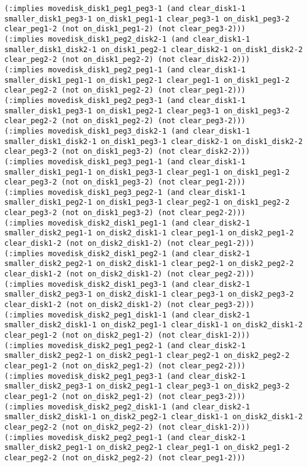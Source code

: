 \documentclass[12pt,letterpaper]{ntdhw}
\begin{document}
\begin{enumerate}
\begin{enumerate}
\begin{lstlisting}[language=pddl, style=pddlstyle,
  basicstyle=\scriptsize]
(:implies movedisk_disk1_peg1_peg3-1 (and clear_disk1-1 smaller_disk1_peg3-1 on_disk1_peg1-1 clear_peg3-1 on_disk1_peg3-2 clear_peg1-2 (not on_disk1_peg1-2) (not clear_peg3-2)))
(:implies movedisk_disk1_peg2_disk2-1 (and clear_disk1-1 smaller_disk1_disk2-1 on_disk1_peg2-1 clear_disk2-1 on_disk1_disk2-2 clear_peg2-2 (not on_disk1_peg2-2) (not clear_disk2-2)))
(:implies movedisk_disk1_peg2_peg1-1 (and clear_disk1-1 smaller_disk1_peg1-1 on_disk1_peg2-1 clear_peg1-1 on_disk1_peg1-2 clear_peg2-2 (not on_disk1_peg2-2) (not clear_peg1-2)))
(:implies movedisk_disk1_peg2_peg3-1 (and clear_disk1-1 smaller_disk1_peg3-1 on_disk1_peg2-1 clear_peg3-1 on_disk1_peg3-2 clear_peg2-2 (not on_disk1_peg2-2) (not clear_peg3-2)))
(:implies movedisk_disk1_peg3_disk2-1 (and clear_disk1-1 smaller_disk1_disk2-1 on_disk1_peg3-1 clear_disk2-1 on_disk1_disk2-2 clear_peg3-2 (not on_disk1_peg3-2) (not clear_disk2-2)))
(:implies movedisk_disk1_peg3_peg1-1 (and clear_disk1-1 smaller_disk1_peg1-1 on_disk1_peg3-1 clear_peg1-1 on_disk1_peg1-2 clear_peg3-2 (not on_disk1_peg3-2) (not clear_peg1-2)))
(:implies movedisk_disk1_peg3_peg2-1 (and clear_disk1-1 smaller_disk1_peg2-1 on_disk1_peg3-1 clear_peg2-1 on_disk1_peg2-2 clear_peg3-2 (not on_disk1_peg3-2) (not clear_peg2-2)))
(:implies movedisk_disk2_disk1_peg1-1 (and clear_disk2-1 smaller_disk2_peg1-1 on_disk2_disk1-1 clear_peg1-1 on_disk2_peg1-2 clear_disk1-2 (not on_disk2_disk1-2) (not clear_peg1-2)))
(:implies movedisk_disk2_disk1_peg2-1 (and clear_disk2-1 smaller_disk2_peg2-1 on_disk2_disk1-1 clear_peg2-1 on_disk2_peg2-2 clear_disk1-2 (not on_disk2_disk1-2) (not clear_peg2-2)))
(:implies movedisk_disk2_disk1_peg3-1 (and clear_disk2-1 smaller_disk2_peg3-1 on_disk2_disk1-1 clear_peg3-1 on_disk2_peg3-2 clear_disk1-2 (not on_disk2_disk1-2) (not clear_peg3-2)))
(:implies movedisk_disk2_peg1_disk1-1 (and clear_disk2-1 smaller_disk2_disk1-1 on_disk2_peg1-1 clear_disk1-1 on_disk2_disk1-2 clear_peg1-2 (not on_disk2_peg1-2) (not clear_disk1-2)))
(:implies movedisk_disk2_peg1_peg2-1 (and clear_disk2-1 smaller_disk2_peg2-1 on_disk2_peg1-1 clear_peg2-1 on_disk2_peg2-2 clear_peg1-2 (not on_disk2_peg1-2) (not clear_peg2-2)))
(:implies movedisk_disk2_peg1_peg3-1 (and clear_disk2-1 smaller_disk2_peg3-1 on_disk2_peg1-1 clear_peg3-1 on_disk2_peg3-2 clear_peg1-2 (not on_disk2_peg1-2) (not clear_peg3-2)))
(:implies movedisk_disk2_peg2_disk1-1 (and clear_disk2-1 smaller_disk2_disk1-1 on_disk2_peg2-1 clear_disk1-1 on_disk2_disk1-2 clear_peg2-2 (not on_disk2_peg2-2) (not clear_disk1-2)))
(:implies movedisk_disk2_peg2_peg1-1 (and clear_disk2-1 smaller_disk2_peg1-1 on_disk2_peg2-1 clear_peg1-1 on_disk2_peg1-2 clear_peg2-2 (not on_disk2_peg2-2) (not clear_peg1-2)))

\end{lstlisting}
\end{enumerate}
\end{enumerate}
\end{document}
